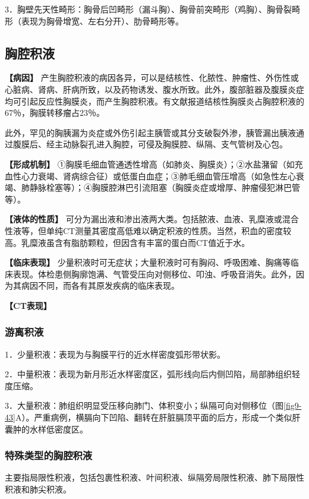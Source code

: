 3．胸壁先天性畸形：胸骨后凹畸形（漏斗胸）、胸骨前突畸形（鸡胸）、胸骨裂畸形（表现为胸骨增宽、左右分开）、肋骨畸形等。

\subsection{胸腔积液}

\textbf{【病因】}
产生胸腔积液的病因各异，可以是结核性、化脓性、肿瘤性、外伤性或心脏病、肾病、肝病所致，以及药物诱发、腹水所致。此外，腹部脏器及腹膜炎症均可引起反应性胸膜炎，而产生胸腔积液。有文献报道结核性胸膜炎占胸腔积液的67％，胸膜转移瘤占23％。

此外，罕见的胸胰漏为炎症或外伤引起主胰管或其分支破裂外渗，胰管漏出胰液通过腹膜后、经主动脉裂孔进入胸腔，可侵及胸膜腔、纵隔、支气管树及心包。

\textbf{【形成机制】}
①胸膜毛细血管通透性增高（如肺炎、胸膜炎）；②水盐潴留（如充血性心力衰竭、肾病综合征）或低蛋白血症；③肺毛细血管压增高（如急性左心衰竭、肺静脉栓塞等）；④胸膜腔淋巴引流阻塞（胸膜炎症或增厚、肿瘤侵犯淋巴管等）。

\textbf{【液体的性质】}
可分为漏出液和渗出液两大类。包括脓液、血液、乳糜液或混合性液等，但单纯CT测量其密度高低难以确定积液的性质。当然，积血的密度较高。乳糜液虽含有脂肪颗粒，但因含有丰富的蛋白而CT值近于水。

\textbf{【临床表现】}
少量积液时可无症状；大量积液时可有胸闷、呼吸困难、胸痛等临床表现。体检患侧胸廓饱满、气管受压向对侧移位、叩浊、呼吸音消失。此外，因为其病因不同，而各有其原发疾病的临床表现。

\textbf{【CT表现】}

\subsubsection{游离积液}

1．少量积液：表现为与胸膜平行的近水样密度弧形带状影。

2．中量积液：表现为新月形近水样密度区，弧形线向后内侧凹陷，局部肺组织轻度压缩。

3．大量积液：肺组织明显受压移向肺门、体积变小；纵隔可向对侧移位（图\ref{fig9-43}A）。严重病例，横膈向下凹陷、翻转在肝脏膈顶平面的后方，形成一个类似肝囊肿的水样低密度区。

\subsubsection{特殊类型的胸腔积液}

主要指局限性积液，包括包裹性积液、叶间积液、纵隔旁局限性积液、肺下局限性积液和肺尖积液。

